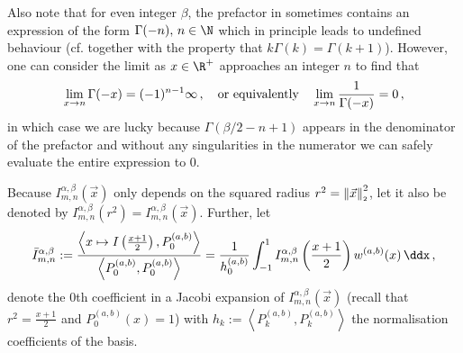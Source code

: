 Also note that for even integer $\beta$, the prefactor in  sometimes contains an expression of the form $\Gamma(-n),\, n \in \N$ which in principle leads to undefined behaviour (cf.  together with the property that $k \Gamma(k) = \Gamma(k+1)$).
However, one can consider the limit as $x \in \R^+$ approaches an integer $n$ to find that
$$\lim_{x \rightarrow n} \Gamma(-x) = (-1)^{n-1} \infty\,, \quad\text{or equivalently}\quad \lim_{x \rightarrow n} \frac{1}{\Gamma(-x)} = 0\,,$$
in which case we are lucky because $\Gamma(\beta/2-n+1)$ appears in the denominator of the prefactor and without any singularities in the numerator we can safely evaluate the entire expression to $0$.

Because $I_{m,n}^{\alpha,\beta}(\vec{x})$ only depends on the squared radius $r^2 = \left\lVert\vec{x}\right\rVert_{\scriptscriptstyle 2}^2$, let it also be denoted by $I_{m,n}^{\alpha,\beta}(r^2) = I_{m,n}^{\alpha,\beta}(\vec{x})$.
Further, let
\begin{equation}
  \bar{I}_{m,n}^{\alpha,\beta} := \frac{\left\langle x \mapsto I\left(\frac{x+1}{2}\right), P_0^{(a, b)} \right\rangle}{\left\langle P_0^{(a, b)}, P_0^{(a, b)} \right\rangle} = \frac{1}{h_0^{(a, b)}} \int_{-1}^{1} I_{m,n}^{\alpha,\beta}\left(\frac{x+1}{2}\right) w^{(a,b)}(x) \,\ddx\,,
  \label{eq:0th-coeff-of-I}
\end{equation}
denote the 0th coefficient in a Jacobi expansion of $I_{m,n}^{\alpha,\beta}(\vec{x})$ (recall that $r^2 = \frac{x+1}{2}$ and $P_0^{(a, b)}(x) = 1$) with $h_k := \left\langle P_k^{(a, b)}, P_k^{(a, b)} \right\rangle$ the normalisation coefficients of the basis.
